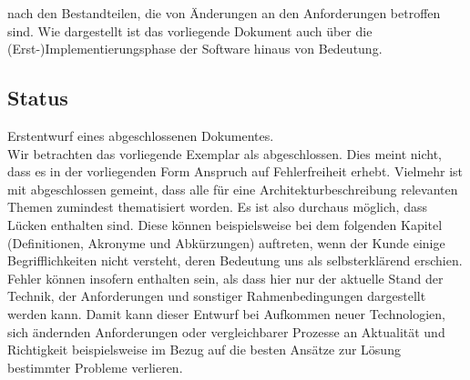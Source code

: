 \documentclass[enabledeprecatedfontcommands,fontsize=11pt,paper=a4,twoside]{scrartcl}
\newcounter{one}
\begin{document}
nach den Bestandteilen, die von Änderungen an den Anforderungen betroffen sind. Wie dargestellt ist das vorliegende Dokument auch über die (Erst-)Implementierungsphase der Software hinaus von Bedeutung.
\newpage
\subsection{Status}
Erstentwurf eines abgeschlossenen Dokumentes. \\
Wir betrachten das vorliegende Exemplar als abgeschlossen. Dies meint nicht, dass es in der vorliegenden Form Anspruch auf Fehlerfreiheit erhebt. Vielmehr ist mit abgeschlossen gemeint, dass alle für eine Architekturbeschreibung relevanten Themen zumindest thematisiert worden. Es ist also durchaus möglich, dass Lücken enthalten sind. Diese können beispielsweise bei dem folgenden Kapitel (Definitionen, Akronyme und Abkürzungen) auftreten, wenn der Kunde einige Begrifflichkeiten nicht versteht, deren Bedeutung uns als selbsterklärend erschien. Fehler können insofern enthalten sein, als dass hier nur der aktuelle Stand der Technik, der Anforderungen und sonstiger Rahmenbedingungen dargestellt werden kann. Damit kann dieser Entwurf bei Aufkommen neuer Technologien, sich ändernden Anforderungen oder vergleichbarer Prozesse an Aktualität und Richtigkeit beispielsweise im Bezug auf die besten Ansätze zur Lösung bestimmter Probleme verlieren.

\newpage
\end{document}
